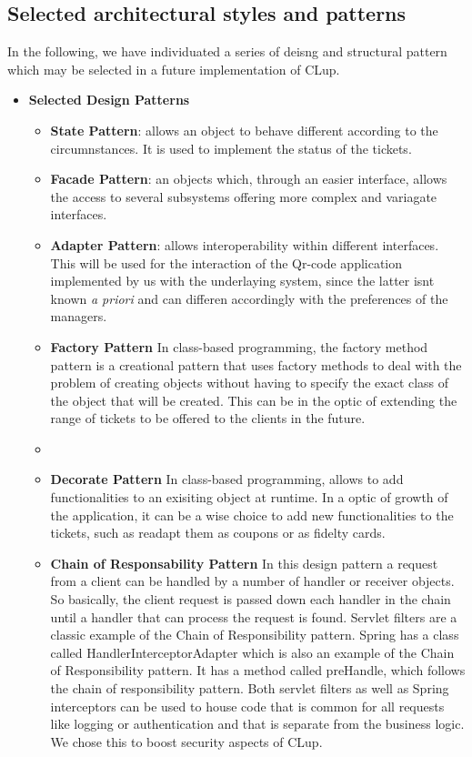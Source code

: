 \subsection{Selected architectural styles and patterns}
\label{subsect:selectedarchitecturalstylesandpatterns}

In the following, we have individuated a series of deisng and structural pattern which may be selected in a future implementation of CLup.


\begin{itemize}
    \item \textbf{Selected Design Patterns}
          \begin{itemize}
            
            \item \textbf{State Pattern}: allows an object to behave different according to the circumnstances. It is used to implement the status of the tickets.
            \item \textbf{Facade Pattern}: an objects which, through an easier interface, allows the access to several subsystems offering more complex and variagate interfaces.
            \item \textbf{Adapter Pattern}: allows interoperability within different interfaces. This will be used for the interaction of the Qr-code application implemented by us with the underlaying system, since the latter isnt known \textit{a priori} and can differen accordingly with the preferences of the managers.
            \item \textbf{Factory Pattern} In class-based programming, the factory method pattern is a creational pattern that uses factory methods to deal with the problem of creating objects without having to specify the exact class of the object that will be created. This can be in the optic of extending the range of tickets to be offered to the clients in the future.
            \item \item \textbf{Decorate Pattern} In class-based programming, allows to add functionalities to an exisiting object at runtime.
            In a optic of growth of the application, it can be a wise choice to add new functionalities to the tickets, such as readapt them as coupons or as fidelty cards.
            \item \textbf{Chain of Responsability Pattern}  In this design pattern a request from a client can be handled by a number of handler or receiver objects. So basically, the client request is passed down each handler in the chain until a handler that can process the request is found. Servlet filters are a classic example of the Chain of Responsibility pattern. Spring has a class called HandlerInterceptorAdapter which is also an example of the Chain of Responsibility pattern. It has a method called preHandle, which follows the chain of responsibility pattern. Both servlet filters as well as Spring interceptors can be used to house code that is common for all requests like logging or authentication and that is separate from the business logic. We chose this to boost security aspects of CLup.

\end{itemize}
\end{itemize}
